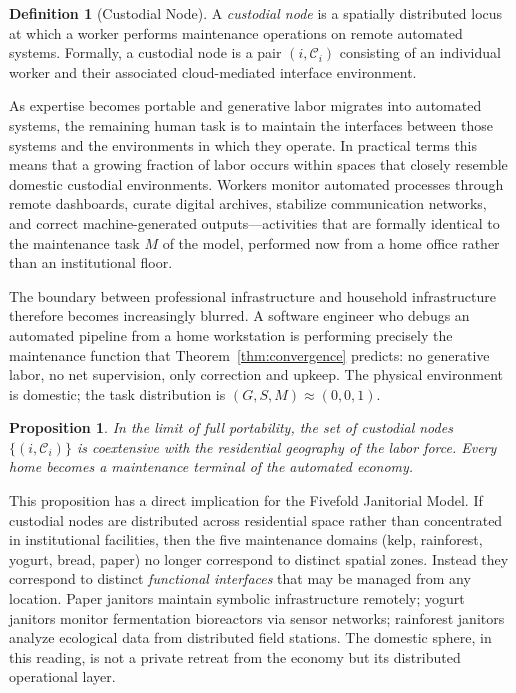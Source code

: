 \documentclass[12pt,a4paper]{article}
\theoremstyle{plain}
\newtheorem{proposition}[theorem]{Proposition}
\theoremstyle{definition}
\newtheorem{definition}[theorem]{Definition}
\theoremstyle{remark}
\begin{document}
\begin{definition}[Custodial Node]
A \emph{custodial node} is a spatially distributed locus at which a worker
performs maintenance operations on remote automated systems.  Formally, a
custodial node is a pair $(i, \mathcal{C}_i)$ consisting of an individual
worker and their associated cloud-mediated interface environment.
\end{definition}

As expertise becomes portable and generative labor migrates into automated
systems, the remaining human task is to maintain the interfaces between
those systems and the environments in which they operate.  In practical terms
this means that a growing fraction of labor occurs within spaces that
closely resemble domestic custodial environments.  Workers monitor automated
processes through remote dashboards, curate digital archives, stabilize
communication networks, and correct machine-generated outputs---activities
that are formally identical to the maintenance task $M$ of the model,
performed now from a home office rather than an institutional floor.

The boundary between professional infrastructure and household infrastructure
therefore becomes increasingly blurred.  A software engineer who debugs an
automated pipeline from a home workstation is performing precisely the
maintenance function that Theorem~\ref{thm:convergence} predicts: no
generative labor, no net supervision, only correction and upkeep.  The
physical environment is domestic; the task distribution is $(G,S,M) \approx
(0,0,1)$.

\begin{proposition}
In the limit of full portability, the set of custodial nodes $\{(i,
\mathcal{C}_i)\}$ is coextensive with the residential geography of the labor
force.  Every home becomes a maintenance terminal of the automated economy.
\end{proposition}

This proposition has a direct implication for the Fivefold Janitorial Model.
If custodial nodes are distributed across residential space rather than
concentrated in institutional facilities, then the five maintenance domains
(kelp, rainforest, yogurt, bread, paper) no longer correspond to distinct
spatial zones.  Instead they correspond to distinct \emph{functional
interfaces} that may be managed from any location.  Paper janitors maintain
symbolic infrastructure remotely; yogurt janitors monitor fermentation
bioreactors via sensor networks; rainforest janitors analyze ecological data
from distributed field stations.  The domestic sphere, in this reading, is
not a private retreat from the economy but its distributed operational layer.
\end{document}
